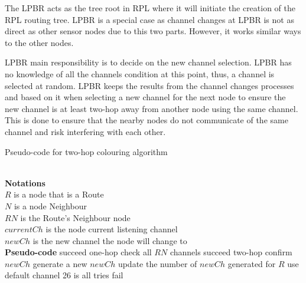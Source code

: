 The LPBR acts as the tree root in RPL where it will initiate the creation of the RPL routing tree. LPBR is a special case as channel changes at LPBR is not as direct as other sensor nodes due to this two parts. However, it works similar ways to the other nodes.



LPBR main responsibility is to decide on the new channel selection. LPBR has no knowledge of all the channels condition at this point, thus, a channel is selected at random. LPBR keeps the results from the channel changes processes and based on it when selecting a new channel for the next node to ensure the new channel is at least two-hop away from another node using the same channel. This is done to ensure that the nearby nodes do not communicate of the same channel and risk interfering with each other.

\begin{algorithm}
\caption{Pseudo-code for two-hop colouring algorithm}
\label{twohop_algo}
\begin{algorithmic}[]
\\\textbf{Notations}
\\$R$ is a node that is a Route
\\$N$ is a node Neighbour
\\$RN$ is the Route's Neighbour node
\\$currentCh$ is the node current listening channel
\\$newCh$ is the new channel the node will change to
\\\textbf{Pseudo-code}
		\State succeed one-hop
		\State check all $RN$ channels
			\State succeed two-hop
			\State confirm $newCh$
		\EndIf
	\Else
		\State generate a new $newCh$
		\State update the number of $newCh$ generated for $R$
		\State use default channel 26 is all tries fail
	\EndIf
\end{algorithmic}
\end{algorithm}

